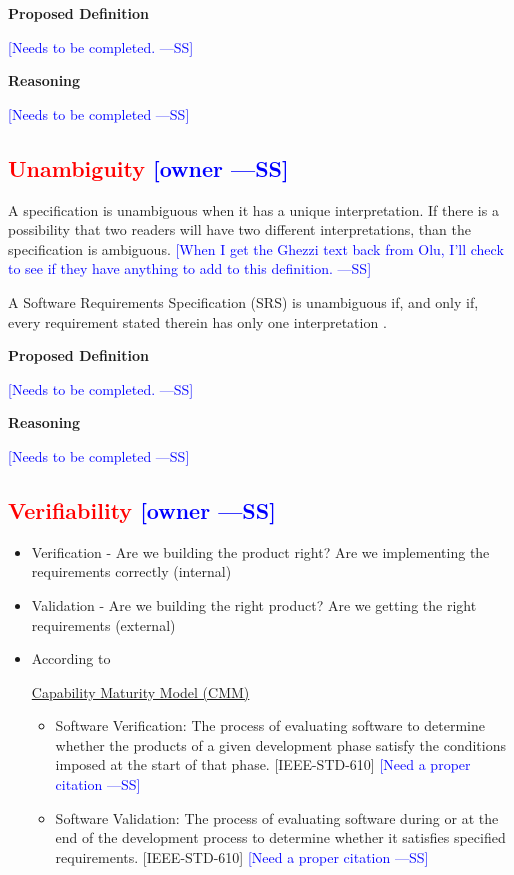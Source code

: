 \documentclass[letterpaper,cleveref]{lipics-v2019}
\newcommand{\authornote}[3]{\textcolor{#1}{[#3 ---#2]}}
\newcommand{\authornote}[3]{}
\newcommand{\wss}[1]{\authornote{blue}{SS}{#1}} %
\newcommand{\notdone}[1]{\textcolor{red}{#1}}
\theoremstyle{definition}
\begin{document}
\noindent \textbf{Proposed Definition} 

\wss{Needs to be completed.}

\noindent \textbf{Reasoning}

\wss{Needs to be completed}

\subsection{\notdone{Unambiguity} \wss{owner}}

A specification is unambiguous when it has a unique interpretation.  If there is
a possibility that two readers will have two different interpretations, than the
specification is ambiguous.  \wss{When I get the Ghezzi text back from Olu, I'll
	check to see if they have anything to add to this definition.}

A Software Requirements Specification (SRS) is unambiguous if, and only if,
every requirement stated therein has only one interpretation \citep{IEEE1998}.

\noindent \textbf{Proposed Definition} 

\wss{Needs to be completed.}

\noindent \textbf{Reasoning}

\wss{Needs to be completed}

\subsection{\notdone{Verifiability} \wss{owner}}

\begin{itemize}
	
	\item Verification - Are we building the product right?  Are we implementing the
	requirements correctly (internal)
	\item Validation - Are we building the right product? Are we getting the right
	requirements (external)
	\item According to
	
	\href{https://en.wikipedia.org/wiki/Software_verification_and_validation}{Capability
		Maturity Model (CMM)}
	\begin{itemize}
		\item 
		Software Verification: The process of evaluating software to determine
		whether the products of a given development phase satisfy the conditions
		imposed at the start of that phase. [IEEE-STD-610] \wss{Need a proper
			citation}
		\item Software Validation: The process of evaluating software during or at the
		end of the development process to determine whether it satisfies specified
		requirements. [IEEE-STD-610] \wss{Need a proper citation}
	\end{itemize}
\end{itemize}
\end{document}
